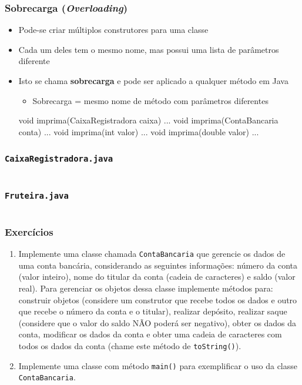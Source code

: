 \documentclass[xcolor={dvipsnames,table},aspectratio=169]{beamer}
\begin{document}
\begin{frame}[fragile]\frametitle{Sobrecarga (\emph{Overloading})}
\begin{itemize}
	\item Pode-se criar múltiplos construtores para uma classe
	\item Cada um deles tem o mesmo nome, mas possui uma lista de parâmetros diferente
	\item Isto se chama \textbf{sobrecarga} e pode ser aplicado a qualquer método em Java
	\begin{itemize}
		\item Sobrecarga = mesmo nome de método com parâmetros diferentes
	\end{itemize}
\begin{javacode}
void imprima(CaixaRegistradora caixa) { ... }
void imprima(ContaBancaria conta)     { ... }
void imprima(int valor)               { ... }
void imprima(double valor)            { ... }
\end{javacode}
\end{itemize}
\end{frame}

\begin{frame}[fragile]\frametitle{\texttt{CaixaRegistradora.java}}
{\tiny\inputminted[bgcolor=cyan!10]{java}{src/caixa2/CaixaRegistradora.java}}
\end{frame}

\begin{frame}[fragile]\frametitle{\texttt{Fruteira.java}}
{\tiny\inputminted[bgcolor=cyan!10]{java}{src/caixa2/Fruteira.java}}
\end{frame}

\begin{frame}[fragile]\frametitle{Exercícios}
\begin{enumerate}
	\item Implemente uma classe chamada \texttt{ContaBancaria} que gerencie os dados de uma conta bancária, considerando as seguintes informações: número da conta (valor inteiro), nome do titular da conta (cadeia de caracteres) e saldo (valor real). Para gerenciar os objetos dessa classe implemente métodos para: construir objetos (considere um construtor que recebe todos os dados e outro que recebe o número da conta e o titular), realizar depósito, realizar saque (considere que o valor do saldo NÃO poderá ser negativo), obter os dados da conta, modificar os dados da conta e obter uma cadeia de caracteres com todos os dados da conta (chame este método de \texttt{toString()}).
	\item Implemente uma classe com método \texttt{main()} para exemplificar o uso da classe \texttt{ContaBancaria}.
\end{enumerate}
\end{frame}
\end{document}
